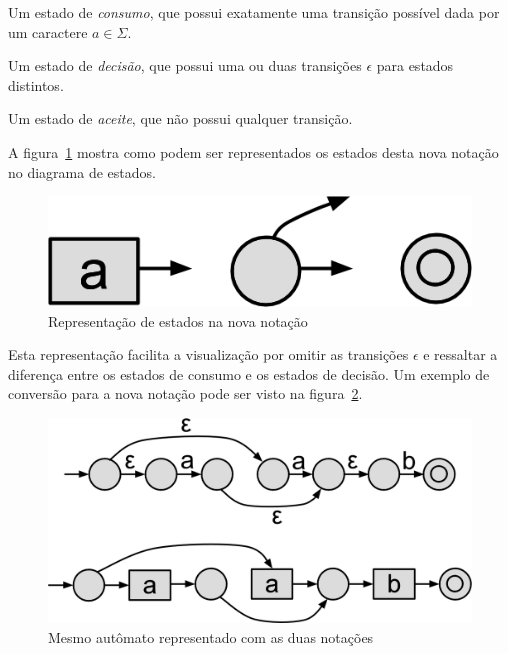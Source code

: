 \documentclass[a4paper,12pt,oneside,onecolumn]{uerj}
\begin{document}
\begin{lcircp}
    \item Um estado de \emph{consumo}, que possui exatamente uma transição possível dada por um caractere $a \in \Sigma$.
    \item Um estado de \emph{decisão}, que possui uma ou duas transições $\epsilon$ para estados distintos.
    \item Um estado de \emph{aceite}, que não possui qualquer transição.
\end{lcircp}

A figura~\ref{fig:nova_notacao} mostra como podem ser representados os estados desta nova notação no diagrama de estados.

\begin{figure}[ht]
  \centering
  \includegraphics[scale=0.5]{figures/nova_notacao.png}
  \caption{Representação de estados na nova notação}
  \label{fig:nova_notacao}
\end{figure}

Esta representação facilita a visualização por omitir as transições $\epsilon$ e ressaltar a diferença entre os estados de consumo e os estados de decisão. Um exemplo de conversão para a nova notação pode ser visto na figura~\ref{fig:exemplo_nova_notacao}.

\begin{figure}[ht]
  \centering
  \includegraphics[scale=0.25]{figures/exemplo_nova_notacao.png}
  \caption{Mesmo autômato representado com as duas notações}
  \label{fig:exemplo_nova_notacao}
\end{figure}
\end{document}
